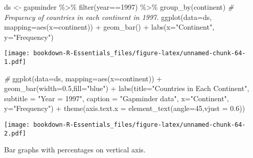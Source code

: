 \documentclass[
]{book}
\newenvironment{Shaded}{\begin{snugshade}}{\end{snugshade}}
\newcommand{\AttributeTok}[1]{\textcolor[rgb]{0.77,0.63,0.00}{#1}}
\newcommand{\CommentTok}[1]{\textcolor[rgb]{0.56,0.35,0.01}{\textit{#1}}}
\newcommand{\DecValTok}[1]{\textcolor[rgb]{0.00,0.00,0.81}{#1}}
\newcommand{\FloatTok}[1]{\textcolor[rgb]{0.00,0.00,0.81}{#1}}
\newcommand{\FunctionTok}[1]{\textcolor[rgb]{0.00,0.00,0.00}{#1}}
\newcommand{\NormalTok}[1]{#1}
\newcommand{\OtherTok}[1]{\textcolor[rgb]{0.56,0.35,0.01}{#1}}
\newcommand{\SpecialCharTok}[1]{\textcolor[rgb]{0.00,0.00,0.00}{#1}}
\newcommand{\StringTok}[1]{\textcolor[rgb]{0.31,0.60,0.02}{#1}}
\begin{document}
\begin{Shaded}
\begin{Highlighting}[]
\NormalTok{ds }\OtherTok{\textless{}{-}}\NormalTok{ gapminder }\SpecialCharTok{\%\textgreater{}\%} 
  \FunctionTok{filter}\NormalTok{(year}\SpecialCharTok{==}\DecValTok{1997}\NormalTok{) }\SpecialCharTok{\%\textgreater{}\%} 
  \FunctionTok{group\_by}\NormalTok{(continent) }
\CommentTok{\# Frequency of countries in each continent in 1997.}
\FunctionTok{ggplot}\NormalTok{(}\AttributeTok{data=}\NormalTok{ds, }\AttributeTok{mapping=}\FunctionTok{aes}\NormalTok{(}\AttributeTok{x=}\NormalTok{continent)) }\SpecialCharTok{+} 
  \FunctionTok{geom\_bar}\NormalTok{() }\SpecialCharTok{+}
  \FunctionTok{labs}\NormalTok{(}\AttributeTok{x=}\StringTok{"Continent"}\NormalTok{, }\AttributeTok{y=}\StringTok{"Frequency"}\NormalTok{)}
\end{Highlighting}
\end{Shaded}

\texttt{[image: bookdown-R-Essentials\_files/figure-latex/unnamed-chunk-64-1.pdf]}

\begin{Shaded}
\begin{Highlighting}[]
\CommentTok{\#}
\FunctionTok{ggplot}\NormalTok{(}\AttributeTok{data=}\NormalTok{ds, }\AttributeTok{mapping=}\FunctionTok{aes}\NormalTok{(}\AttributeTok{x=}\NormalTok{continent)) }\SpecialCharTok{+} 
  \FunctionTok{geom\_bar}\NormalTok{(}\AttributeTok{width=}\FloatTok{0.5}\NormalTok{,}\AttributeTok{fill=}\StringTok{"blue"}\NormalTok{) }\SpecialCharTok{+}
  \FunctionTok{labs}\NormalTok{(}\AttributeTok{title=}\StringTok{"Countries in Each Continent"}\NormalTok{,}
       \AttributeTok{subtitle =} \StringTok{"Year = 1997"}\NormalTok{,}
       \AttributeTok{caption =} \StringTok{"Gapminder data"}\NormalTok{,}
       \AttributeTok{x=}\StringTok{"Continent"}\NormalTok{, }
       \AttributeTok{y=}\StringTok{"Frequency"}\NormalTok{) }\SpecialCharTok{+}
  \FunctionTok{theme}\NormalTok{(}\AttributeTok{axis.text.x =} \FunctionTok{element\_text}\NormalTok{(}\AttributeTok{angle=}\DecValTok{45}\NormalTok{,}\AttributeTok{vjust =} \FloatTok{0.6}\NormalTok{))}
\end{Highlighting}
\end{Shaded}

\texttt{[image: bookdown-R-Essentials\_files/figure-latex/unnamed-chunk-64-2.pdf]}

Bar graphs with percentages on vertical axis.
\end{document}

